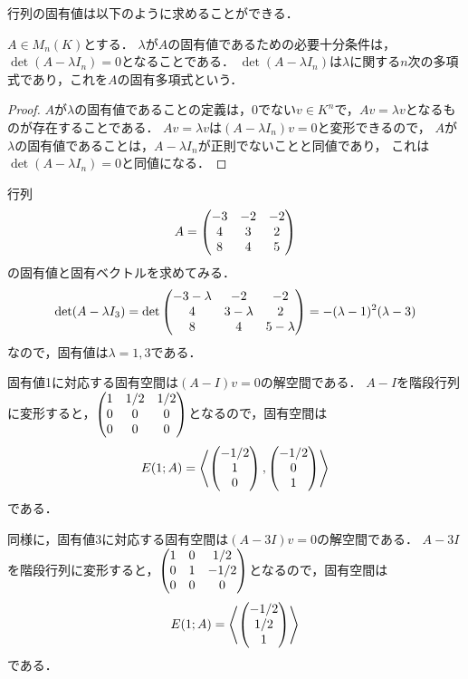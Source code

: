 行列の固有値は以下のように求めることができる．
\begin{prop}
    $A \in M_n(K)$とする．
    $\lambda$が$A$の固有値であるための必要十分条件は，$\det(A-\lambda I_n) = 0$となることである．
    $\det(A - \lambda I_n)$は$\lambda$に関する$n$次の多項式であり，これを$A$の固有多項式という．
\end{prop}
\begin{proof}
    $A$が$\lambda$の固有値であることの定義は，0でない$v \in K^n$で，$Av = \lambda v$となるものが存在することである．
    $Av = \lambda v$は$(A-\lambda I_n)v = 0$と変形できるので，
    $A$が$\lambda$の固有値であることは，$A - \lambda I_n$が正則でないことと同値であり，
    これは$\det(A-\lambda I_n) = 0$と同値になる．
\end{proof}
\begin{example}\label{eg:eigen}
行列
\[
    A = \begin{pmatrix} 
        -3 & -2 & -2 \\
        4 & 3 & 2 \\
        8 & 4 & 5
     \end{pmatrix}
\]
の固有値と固有ベクトルを求めてみる．
\[
    \det (A - \lambda I_3) 
    = \det \begin{pmatrix} 
        -3-\lambda & -2 & -2 \\
        4 & 3-\lambda & 2 \\
        8 & 4 & 5-\lambda
     \end{pmatrix}
    = - (\lambda-1)^2(\lambda - 3)
\]
なので，固有値は$\lambda = 1,3$である．

固有値1に対応する固有空間は$(A-I)v=0$の解空間である．
$A-I$を階段行列に変形すると，$\begin{pmatrix} 1 & 1/2 & 1/2 \\ 0 & 0 & 0 \\ 0 & 0 & 0 \end{pmatrix}$となるので，固有空間は
\[
    E(1;A) = \left\langle \begin{pmatrix} -1/2 \\ 1 \\ 0 \end{pmatrix},\begin{pmatrix} -1/2 \\ 0 \\ 1 \end{pmatrix} \right\rangle    
\]
である．

同様に，固有値3に対応する固有空間は$(A-3I)v=0$の解空間である．
$A-3 I$を階段行列に変形すると，$\begin{pmatrix} 1 & 0 & 1/2 \\ 0 & 1 & -1/2 \\ 0 & 0 & 0 \end{pmatrix}$となるので，固有空間は
\[
    E(1;A) = \left\langle \begin{pmatrix} -1/2 \\ 1/2 \\ 1 \end{pmatrix} \right\rangle    
\]
である．
\end{example}
